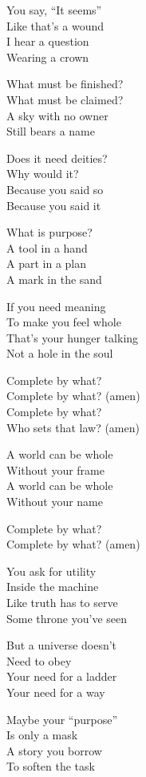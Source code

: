 \begin{lyrics}
You say, “It seems”\\
Like that’s a wound\\
I hear a question\\
Wearing a crown

What must be finished?\\
What must be claimed?\\
A sky with no owner\\
Still bears a name

Does it need deities?\\
Why would it?\\
Because you said so\\
Because you said it

What is purpose?\\
A tool in a hand\\
A part in a plan\\
A mark in the sand

If you need meaning\\
To make you feel whole\\
That’s your hunger talking\\
Not a hole in the soul

Complete by what?\\
Complete by what? (amen)\\
Complete by what?\\
Who sets that law? (amen)

A world can be whole\\
Without your frame\\
A world can be whole\\
Without your name

Complete by what?\\
Complete by what? (amen)

You ask for utility\\
Inside the machine\\
Like truth has to serve\\
Some throne you’ve seen

But a universe doesn’t\\
Need to obey\\
Your need for a ladder\\
Your need for a way

Maybe your “purpose”\\
Is only a mask\\
A story you borrow\\
To soften the task


\end{lyrics}
